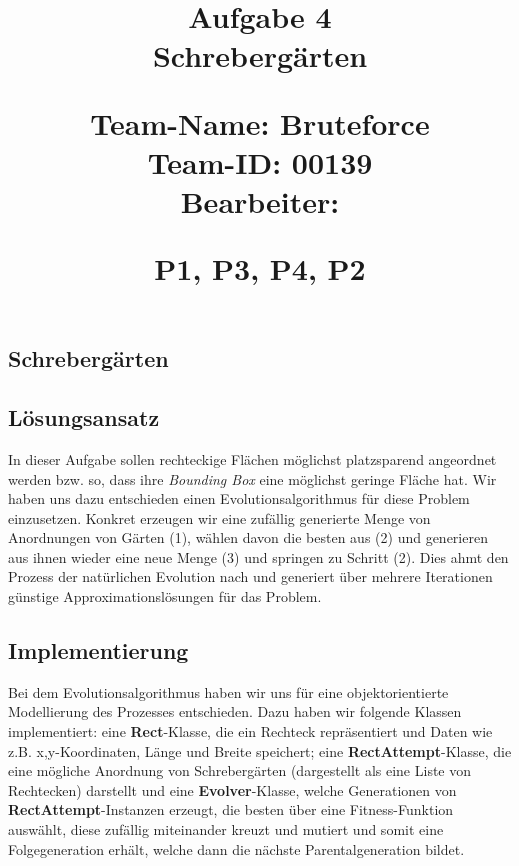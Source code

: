 \documentclass{article}
\newcommand{\q}[1]{\textbf{#1}}
\begin{document}
\title{
{\Huge Aufgabe 4\\Schrebergärten}\\
\vspace{.5cm}
\begin{large}
Team-Name: Bruteforce\\
Team-ID: 00139\\
Bearbeiter:\\ 
\end{large}
\begin{normalsize}
P1,
P3,
P4,
P2
\end{normalsize}
}
\author{}
\date{}
\maketitle
\vspace{5cm}
\tableofcontents
\newpage
\begin{flushleft}
		
\section{Schrebergärten}
\subsection{Lösungsansatz}
In dieser Aufgabe sollen rechteckige Flächen möglichst platzsparend angeordnet werden bzw. so, dass ihre \textit{Bounding Box} eine möglichst geringe Fläche hat. Wir haben uns dazu entschieden einen Evolutionsalgorithmus für diese Problem einzusetzen. Konkret erzeugen wir eine zufällig generierte Menge von Anordnungen von Gärten (1), wählen davon die besten aus (2) und generieren aus ihnen wieder eine neue Menge (3) und springen zu Schritt (2). Dies ahmt den Prozess der natürlichen Evolution nach und generiert über mehrere Iterationen günstige Approximationslösungen für das Problem.  

\subsection{Implementierung}
\label{Implementierung}

Bei dem Evolutionsalgorithmus haben wir uns für eine objektorientierte Modellierung des Prozesses entschieden. Dazu haben wir folgende Klassen implementiert: eine \q{Rect}-Klasse, die ein Rechteck repräsentiert und Daten wie z.B. x,y-Koordinaten, Länge und Breite speichert; eine \q{RectAttempt}-Klasse, die eine mögliche Anordnung von Schrebergärten (dargestellt als eine Liste von Rechtecken) darstellt und eine \q{Evolver}-Klasse, welche Generationen von \q{RectAttempt}-Instanzen erzeugt, die besten über eine Fitness-Funktion auswählt, diese zufällig miteinander kreuzt und mutiert und somit eine Folgegeneration erhält, welche dann die nächste Parentalgeneration bildet. %


\end{flushleft}
\end{document}
